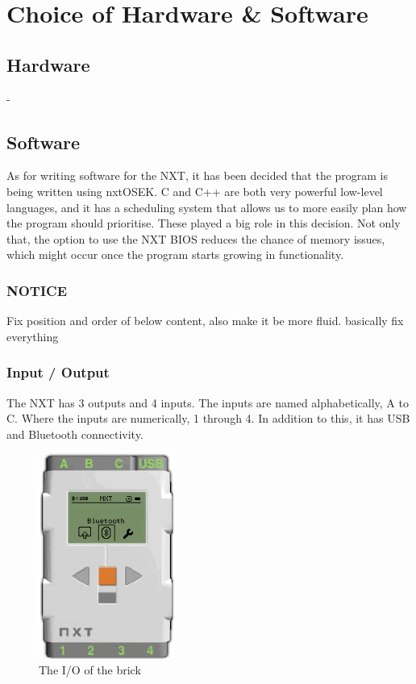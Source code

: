 \section{Choice of Hardware \& Software}

\subsection*{Hardware}
-


\subsection*{Software}
As for writing software for the NXT, it has been decided that the program is being written using nxtOSEK. C and C++ are both very powerful low-level languages, and it has a scheduling system that allows us to more easily plan how the program should prioritise. These played a big role in this decision. Not only that, the option to use the NXT BIOS reduces the chance of memory issues, which might occur once the program starts growing in functionality.

\subsubsection*{NOTICE}
Fix position and order of below content, also make it be more fluid. basically fix everything

\subsubsection*{Input / Output}
The NXT has 3 outputs and 4 inputs. The inputs are named alphabetically, A to C. Where the inputs are numerically, 1 through 4. In addition to this, it has USB and Bluetooth connectivity.

\begin{figure}[H]
    \label{software_nxtbrick}
    \centering
    \includegraphics[width=0.4\textwidth]{Images/Software/NXT/nxtbrick.png}
    \caption{The I/O of the brick}
\end{figure}

